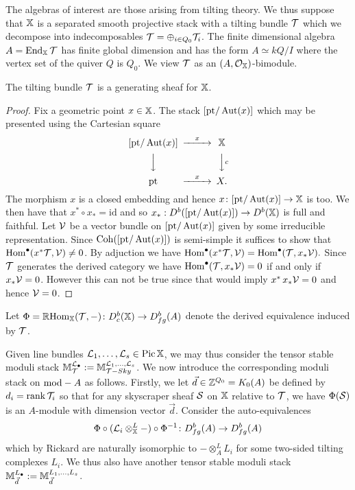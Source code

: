 \documentclass[12pt]{amsart}
\begin{document}
The algebras of interest are those arising from tilting theory. We thus suppose that $\mathbb{X}$ is a separated smooth projective stack with a tilting bundle $\mathcal{T}$ which we decompose into indecomposables $\mathcal{T} = \oplus_{i \in Q_0} \mathcal{T}_i$. The finite dimensional algebra $A = \operatorname{End}_{\mathbb{X}}{\mathcal{T}}$ has finite global dimension and has the form $A \simeq kQ/I$ where the vertex set of the quiver $Q$ is $Q_0$. We view $\mathcal{T}$ as an $(A,\mathcal{O}_{\mathbb{X}})$-bimodule. 
\begin{proposition}  \label{prop:Tgenerates}
The tilting bundle $\mathcal{T}$ is a generating sheaf for $\mathbb{X}$.
\end{proposition}
\begin{proof}
Fix a geometric point $x \in \mathbb{X}$. 
The stack $[\text{pt}/\operatorname{Aut}(x)]$ which may be presented using the Cartesian square 
\begin{equation*}
\begin{CD}
[\text{pt}/\Aut(x)] @>x>> \bX\\
@VVV @VVcV\\
\text{pt} @>x>> X.
\end{CD}
\end{equation*} 
The morphism $x$ is a closed embedding and hence $x \colon [\text{pt}/\operatorname{Aut}(x)] \rightarrow \mathbb{X}$ is too. 
We then have that $x^* \circ x_* = \text{id}$ and so $x_*: D^b([\text{pt}/\operatorname{Aut}(x)]) \rightarrow D^b(\mathbb{X})$ is full and faithful. 
Let $\mathcal{V}$ be a vector bundle on $[\text{pt}/\operatorname{Aut}(x)]$ given by some irreducible representation. 
Since $\operatorname{Coh}([\text{pt}/\operatorname{Aut}(x)])$ is semi-simple it suffices to show that $\operatorname{Hom}^\bullet(x^* \mathcal{T}, \mathcal{V}) \neq 0$. 
By adjuction we have $\operatorname{Hom}^\bullet(x^* \mathcal{T}, \mathcal{V}) = \operatorname{Hom}^\bullet(\mathcal{T}, x_* \mathcal{V}).$ 
Since $\mathcal{T}$ generates the derived category we have $\operatorname{Hom}^\bullet(\mathcal{T}, x_* \mathcal{V})= 0$ if and only if $x_* \mathcal{V} = 0$. 
However this can not be true since that would imply $x^* \, x_* \mathcal{V} = 0$ and hence $\mathcal{V} =0$. 
\end{proof}
Let $\Phi = \mathop{\mathbb{R}\mathrm{Hom}}\nolimits_{\mathbb{X}}(\mathcal{T},-) \colon D^b_{c}(\mathbb{X}) \to D^b_{fg}(A)$ denote the derived equivalence induced by $\mathcal{T}$. 

Given line bundles $\mathcal{L}_1,\ldots, \mathcal{L}_s \in \operatorname{Pic} \mathbb{X}$, we may thus consider the tensor stable moduli stack $\mathbb{M}_{\mathcal{T}}^{\mathcal{L}_{\bullet}} := \mathbb{M}_{\mathcal{T}-Sky}^{\mathcal{L}_1,\ldots,\mathcal{L}_s}$. We now introduce the corresponding moduli stack on $\textup{mod}-A$ as follows. Firstly, we let $\vec{d}\in \mathbb{Z}^{Q_0} = K_0(A)$ be defined by $d_i = \operatorname{rank} \mathcal{T}_i$ so that for any skyscraper sheaf $\mathcal{S}$ on $\mathbb{X}$ relative to $\mathcal{T}$, we have $\Phi(\mathcal{S})$ is an $A$-module with dimension vector $\vec{d}$. Consider the auto-equivalences
$$ \Phi \circ (\mathcal{L}_i \otimes^L_{\mathbb{X}} -) \circ \Phi^{-1} \colon D^b_{fg}(A) \to D^b_{fg}(A)$$
which by Rickard \cite{MR1002456} are naturally isomorphic to $- \otimes^L_A L_i$ for some two-sided tilting complexes $L_i$. We thus also have another tensor stable moduli stack $\mathbb{M}_{\vec{d}}^{L_{\bullet}} := \mathbb{M}_{\vec{d}}^{L_1,\ldots,L_s}$. 
\end{document}
